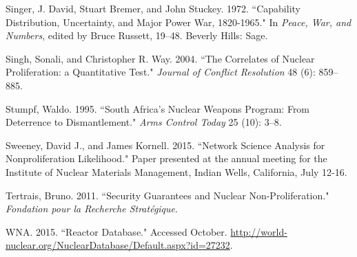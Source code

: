 \begin{thebibliography}{1\kern\bibindent}
 Singer, J. David, Stuart Bremer, and John Stuckey. 1972. ``Capability Distribution, Uncertainty, and Major Power War, 1820-1965." In \textit{Peace, War, and Numbers}, edited by Bruce Russett, 19--48. Beverly Hills: Sage.

 Singh, Sonali, and Christopher R. Way. 2004. ``The Correlates of Nuclear Proliferation: a Quantitative Test." \textit{Journal of Conflict Resolution} 48 (6): 859--885.

 Stumpf, Waldo. 1995. ``South Africa's Nuclear Weapons Program: From Deterrence to Dismantlement." \textit{Arms Control Today} 25 (10): 3--8.

 Sweeney, David J., and James Kornell. 2015. ``Network Science Analysis for Nonproliferation Likelihood." Paper presented at the annual meeting for the Institute of Nuclear Materials Management, Indian Wells, California, July 12-16.

 Tertrais, Bruno. 2011. ``Security Guarantees and Nuclear Non-Proliferation." \textit{Fondation pour la Recherche Strat\'{e}gique}. 

 WNA. 2015. ``Reactor Database." Accessed October. \url{http://world-nuclear.org/NuclearDatabase/Default.aspx?id=27232}.

\end{thebibliography}
